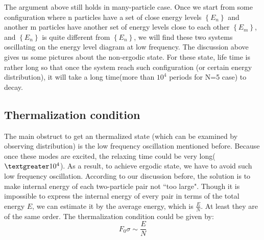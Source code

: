\documentclass[aps,pre,twocolumn,groupedaddress]{revtex4-1}
\begin{document}
The argument above still holds in many-particle case. Once we start from some configuration where n particles have a set of close energy levels $\left\lbrace E_n\right\rbrace $ and another m particles have another set of energy levels close to each other $\left\lbrace E_m\right\rbrace $, and $\left\lbrace E_n\right\rbrace $ is quite different from $\left\lbrace E_n\right\rbrace $, we will find these two systems oscillating on the energy level diagram at low frequency. 
The discussion above gives us some pictures about the non-ergodic state. For these state, life time is rather long so that once the system reach such configuration (or certain energy distribution), it will take a long time(more than $10^4$ periods for N=5 case) to decay. 

\subsection{Thermalization condition}
The main obstruct to get an thermalized state (which can be examined by observing distribution) is the low frequency oscillation mentioned before. Because once these modes are excited, the relaxing time could be very long($\textgreater 10^4$). As a result, to achieve ergodic state, we have to avoid such low frequency oscillation. According to our discussion before, the solution is to make internal energy of each two-particle pair not ``too large". Though it is impossible to express the internal energy of every pair in terms of the total energy $E$, we can estimate it by the average energy, which is $\frac{E}{N}$. At least they are of the same order. The thermalization condition could be given by:
\begin{equation}
F_0\sigma\sim\frac{E}{N}
\label{eq:thermalizatiton condition}
\end{equation}
\end{document}
